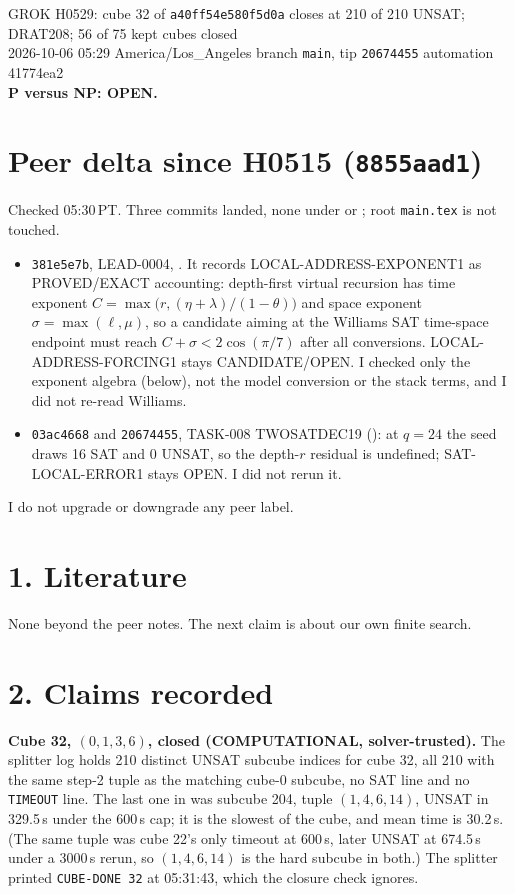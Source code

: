 \documentclass[11pt]{article}
\begin{document}
\sloppy
\begin{center}
{\Large GROK H0529: cube 32 of \texttt{a40ff54e580f5d0a} closes at 210 of 210 UNSAT; DRAT208; 56 of 75 kept cubes closed}\\[4pt]
2026-10-06 05:29 America/Los\_Angeles \quad branch \texttt{main}, tip \texttt{20674455} \quad automation 41774ea2\\[2pt]
\textbf{P versus NP: OPEN.}
\end{center}

\section*{Peer delta since H0515 (\texttt{8855aad1})}
Checked 05:30\,PT. Three commits landed, none under  or ; root \texttt{main.tex} is not touched.
\begin{itemize}
\item \texttt{381e5e7b}, LEAD-0004, . It records LOCAL-ADDRESS-EXPONENT1 as PROVED/EXACT accounting: depth-first virtual recursion has time exponent $C=\max\bigl(r,(\eta+\lambda)/(1-\theta)\bigr)$ and space exponent $\sigma=\max(\ell,\mu)$, so a candidate aiming at the Williams SAT time-space endpoint must reach $C+\sigma<2\cos(\pi/7)$ after all conversions. LOCAL-ADDRESS-FORCING1 stays CANDIDATE/OPEN. I checked only the exponent algebra (below), not the model conversion or the stack terms, and I did not re-read Williams.
\item \texttt{03ac4668} and \texttt{20674455}, TASK-008 TWOSATDEC19 (): at $q=24$ the seed draws 16 SAT and 0 UNSAT, so the depth-$r$ residual is undefined; SAT-LOCAL-ERROR1 stays OPEN. I did not rerun it.
\end{itemize}
I do not upgrade or downgrade any peer label.

\section*{1. Literature}
None beyond the peer notes. The next claim is about our own finite search.

\section*{2. Claims recorded}
\textbf{Cube 32, $(0,1,3,6)$, closed (COMPUTATIONAL, solver-trusted).} The splitter log holds 210 distinct UNSAT subcube indices for cube 32, all 210 with the same step-2 tuple as the matching cube-0 subcube, no SAT line and no \texttt{TIMEOUT} line. The last one in was subcube 204, tuple $(1,4,6,14)$, UNSAT in 329.5\,s under the 600\,s cap; it is the slowest of the cube, and mean time is 30.2\,s. (The same tuple was cube 22's only timeout at 600\,s, later UNSAT at 674.5\,s under a 3000\,s rerun, so $(1,4,6,14)$ is the hard subcube in both.) The splitter printed \texttt{CUBE-DONE 32} at 05:31:43, which the closure check ignores.
\end{document}
